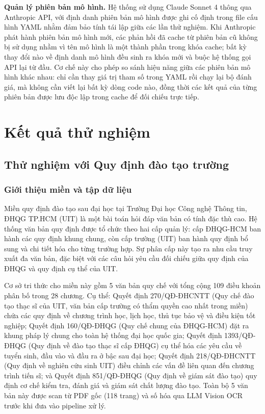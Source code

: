 \textbf{Quản lý phiên bản mô hình.} Hệ thống sử dụng Claude Sonnet 4 thông qua
Anthropic API, với định danh phiên bản mô hình được ghi cố định trong file cấu hình
YAML nhằm đảm bảo tính tái lập giữa các lần thử nghiệm. Khi Anthropic phát hành
phiên bản mô hình mới, các phản hồi đã cache từ phiên bản cũ không bị sử dụng nhầm
vì tên mô hình là một thành phần trong khóa cache; bất kỳ thay đổi nào về định danh
mô hình đều sinh ra khóa mới và buộc hệ thống gọi API lại từ đầu. Cơ chế này cho
phép so sánh hiệu năng giữa các phiên bản mô hình khác nhau: chỉ cần thay giá trị
tham số trong YAML rồi chạy lại bộ đánh giá, mà không cần viết lại bất kỳ dòng
code nào, đồng thời các kết quả của từng phiên bản được lưu độc lập trong cache để
đối chiếu trực tiếp.

\section{Kết quả thử nghiệm}
\label{sec:ket-qua-thu-nghiem}

\subsection{Thử nghiệm với Quy định đào tạo trường}
\label{subsec:casestudy-daotao}

\subsubsection*{Giới thiệu miền và tập dữ liệu}

Miền quy định đào tạo sau đại học tại Trường Đại học Công nghệ Thông tin, ĐHQG
TP.HCM (UIT) là một bài toán hỏi đáp văn bản có tính đặc thù cao. Hệ thống văn bản
quy định được tổ chức theo hai cấp quản lý: cấp ĐHQG-HCM ban hành các quy định
khung chung, còn cấp trường (UIT) ban hành quy định bổ sung và chi tiết hóa cho từng
trường hợp. Sự phân cấp này tạo ra nhu cầu truy xuất đa văn bản, đặc biệt với các câu
hỏi yêu cầu đối chiếu giữa quy định của ĐHQG và quy định cụ thể của UIT.

Cơ sở tri thức cho miền này gồm 5 văn bản quy chế với tổng cộng 109 điều khoản
phân bố trong 28 chương. Cụ thể: Quyết định 270/QĐ-ĐHCNTT (Quy chế đào tạo thạc
sĩ của UIT, văn bản cấp trường có thẩm quyền cao nhất trong miền) chứa các quy
định về chương trình học, lịch học, thủ tục bảo vệ và điều kiện tốt nghiệp; Quyết định
160/QĐ-ĐHQG (Quy chế chung của ĐHQG-HCM) đặt ra khung pháp lý chung cho toàn
hệ thống đại học quốc gia; Quyết định 1393/QĐ-ĐHQG (Quy định về đào tạo thạc sĩ
cấp ĐHQG) cụ thể hóa các yêu cầu về tuyển sinh, đầu vào và đầu ra ở bậc sau đại học;
Quyết định 218/QĐ-ĐHCNTT (Quy định về nghiên cứu sinh UIT) điều chỉnh các vấn đề
liên quan đến chương trình tiến sĩ; và Quyết định 851/QĐ-ĐHQG (Quy định về giám
sát đào tạo) quy định cơ chế kiểm tra, đánh giá và giám sát chất lượng đào tạo. Toàn bộ
5 văn bản này được scan từ PDF gốc (118 trang) và số hóa qua LLM Vision OCR trước
khi đưa vào pipeline xử lý.

